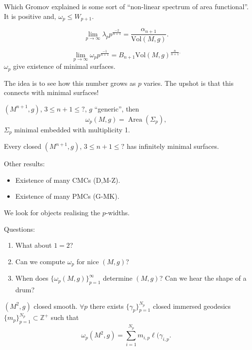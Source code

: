 \noindent
Which Gromov explained is some sort
of ``non-linear spectrum of area
functional''.
It is positive and, $\omega_p \leq W_{p+1}$.

\begin{theorem}
\label{theorem-weyl-sweepouts}
$$
\lim_{p \to \infty}\lambda_p
p^{\frac{-2}{n+1}}
= \frac{\alpha_{n+1}}{\text{Vol}(M,g)}.
$$
\end{theorem}

\begin{theorem}[GGLMN]
\label{theorem-gglm}
$$
\lim_{p \to \infty}\omega_p
p^{\frac{-1}{n+1}}
=B_{n+1}\text{Vol}(M,g)^{\frac{n}{n+1}.}
$$
$\omega_p$ give existence of minimal surfaces.

\end{theorem}

\noindent
The idea is to see how this number
grows as $p$ varies.
The upshot is that this connects
with minimal surfaces!

\begin{theorem}[M-Neves-Z]
\label{theorem-mnz}
$(M^{n+1},g)$, $3 \leq  n+1 \leq  ?$,
$g$ ``generic'', then
$$
\omega_p(M,g)
=\operatorname{Area}(\Sigma_p),
$$
$\Sigma_p$ minimal embedded with multiplicity
1.
\end{theorem}

\begin{lemma}
\label{lemma-yau-conjecture-minimal-surfaces}
Every closed $(M^{n+1},g)$,
$3 \leq  n+1 \leq ?$
has infinitely minimal surfaces.
\end{lemma}

\noindent
Other results:
\begin{itemize}
\item Existence of many CMCs (D,M-Z).
\item Existence of many PMCs (G-MK).
\end{itemize}

\noindent
We look for objects realising the $p$-widths.

\noindent
Questions:
\begin{enumerate}
\item What about $1=2$?
\item Can we compute $\omega_p$ for nice
$(M,g)$?
\item When does $\{\omega_p(M,g)\}_{p=1}^\infty$
determine $(M,g)$?
Can we hear the shape of a drum?
\end{enumerate}

\begin{theorem}[C-M]
\label{theorem-cm1}
$(M^2,g)$
closed smooth. $\forall  p$ there exists
$\{\gamma_p\}_{p=1}^{N_p}$
closed immersed geodesics
$\{m_p\}_{p=1}^{N_p}\subset \mathbb{Z}^+$
such that
$$
\omega_p(M^2,g)
=\sum_{i=1}^{N_p}m_{i,p}\ell(\gamma_{i,p}.
$$
\end{theorem}

